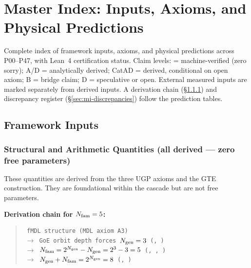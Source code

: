 
\clearpage
\section{Master Index: Inputs, Axioms, and Physical Predictions}
\label{app:master_index}

{\small
Complete index of framework inputs, axioms, and physical predictions across P00--P47,
with Lean~4 certification status. Claim levels: \CatAL{} = machine-verified (zero sorry);
A/D = analytically derived; CatAD = derived, conditional on open axiom; B = bridge claim;
D = speculative or open. External measured inputs are marked separately from derived inputs.
A derivation chain (\S\ref{sec:mi-structural-inputs}) and discrepancy register
(\S\ref{sec:mi-discrepancies}) follow the prediction tables.}

\subsection{Framework Inputs}
\label{sec:mi-inputs}

\subsubsection{Structural and Arithmetic Quantities (all derived — zero free parameters)}
\label{sec:mi-structural-inputs}

These quantities are derived from the three UGP axioms and the GTE construction.
They are foundational within the cascade but are not free parameters.

\medskip
\noindent\textbf{Derivation chain for $N_{\rm fam} = 5$:}
\begin{quote}\small\texttt{%
fMDL structure (MDL axiom A3)\\
$\;\to$ GoE orbit depth forces $N_{\rm gen} = 3$
  (, \CatAL)\\
$\;\to$ $N_{\rm fam} = 2^{N_{\rm gen}} - N_{\rm gen} = 2^3 - 3 = 5$
  (, , \CatAL)\\
$\;\to$ $N_{\rm gen} + N_{\rm fam} = 2^{N_{\rm gen}} = 8$
  (, \CatAL)}
\end{quote}

